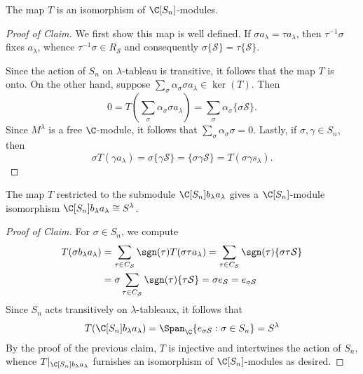 \documentclass[../main.tex]{subfiles}
\begin{document}
\begin{claim}
  The map $ T $ is an isomorphism of $ \C[S_{n}] $-modules.
\end{claim}

\begin{proof}[Proof of Claim]
  We first show this map is well defined. If $ \sigma a_{\lambda} = \tau a_{\lambda} $, then $ \tau^{-1}\sigma $ fixes $ a_{\lambda} $, whence $ \tau^{-1} \sigma \in R_{\mathcal{S}} $ and consequently $ \sigma \{\mathcal{S}\} = \tau\{\mathcal{S}\}$.

  Since the action of $ S_{n} $ on $ \lambda $-tableau is transitive, it follows that the map $ T $ is onto. On the other hand, suppose $ \sum_{\sigma} \alpha_{\sigma}\sigma a_{\lambda} \in \ker(T) $. Then
  \[
    0 = T(\sum_{\sigma} \alpha_{\sigma} \sigma a_{\lambda}) = \sum_{\sigma} \alpha_{\sigma} \{\sigma \mathcal{S}\}.
  \]
  Since $ M^{\lambda} $ is a free $ \C $-module, it follows that $ \sum_{\sigma} \alpha_{\sigma} \sigma = 0 $. Lastly, if $ \sigma, \gamma\in S_{n} $, then
  \[
    \sigma T(\gamma a_{\lambda}) = \sigma\{\gamma \mathcal{S}\} = \{\sigma \gamma \mathcal{S}\} = T(\sigma \gamma s_{\lambda}).
  \]

\end{proof}

\begin{claim}
  The map $ T $ restricted to the submodule $ \C[S_{n}]b_{\lambda} a_{\lambda} $ gives a $ \C[S_{n}] $-module isomorphism $\C[S_{n}]b_{\lambda} a_{\lambda}\cong S^{\lambda} $.
\end{claim}

\begin{proof}[Proof of Claim]
  For $ \sigma\in S_{n} $, we compute
  \begin{align*}
    T(\sigma b_{\lambda} a_{\lambda}) &= \sum_{\tau\in C_{\mathcal{S}}} \sgn(\tau) T(\sigma \tau a_{\lambda}) =  \sum_{\tau\in C_{\mathcal{S}}} \sgn(\tau) \{\sigma \tau \mathcal{S}\} \\
    &= \sigma\sum_{\tau\in C_{\mathcal{S}}} \sgn(\tau) \{\tau \mathcal{S}\} = \sigma e_{\mathcal{S}} = e_{\sigma \mathcal{S}}\\
  \end{align*}
  Since $ S_{n} $ acts transitively on $ \lambda $-tableaux, it follows that
  \[
    T(\C[S_{n}]b_{\lambda}a_{\lambda}) = \Span_{\C}\{e_{\sigma \mathcal{S}}: \sigma\in S_{n}\} = S^{\lambda}
  \]
  By the proof of the previous claim, $ T $ is injective and intertwines the action of $ S_{n} $, whence $ T\vert_{\C[S_{n}]b_{\lambda}a_{\lambda}} $ furnishes an isomorphism of $ \C[S_{n}] $-modules as desired.
\end{proof}
\end{document}
